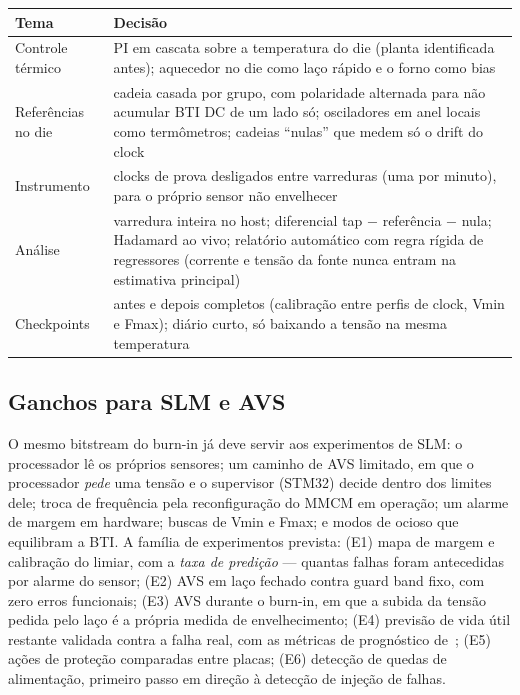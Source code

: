 \documentclass[11pt,a4paper]{article}
\begin{document}
\begin{tabularx}{\textwidth}{@{}l Y@{}}
\toprule
Tema & Decisão \\ \midrule
Controle térmico & PI em cascata sobre a temperatura do die (planta identificada antes); aquecedor no die como laço
rápido e o forno como bias \\
Referências no die & cadeia casada por grupo, com polaridade alternada para não acumular BTI DC de um lado só; osciladores
em anel locais como termômetros; cadeias ``nulas'' que medem só o drift do clock \\
Instrumento & clocks de prova desligados entre varreduras (uma por minuto), para o próprio sensor não envelhecer \\
Análise & varredura inteira no host; diferencial tap $-$ referência $-$ nula; Hadamard ao vivo; relatório automático com
regra rígida de regressores (corrente e tensão da fonte nunca entram na estimativa principal) \\
Checkpoints & antes e depois completos (calibração entre perfis de clock, Vmin e Fmax); diário curto, só baixando a
tensão na mesma temperatura \\
\bottomrule
\end{tabularx}

\subsection{Ganchos para SLM e AVS}

O mesmo bitstream do burn-in já deve servir aos experimentos de SLM: o processador lê os próprios sensores; um caminho de
AVS limitado, em que o processador \emph{pede} uma tensão e o supervisor (STM32) decide dentro dos limites dele; troca de
frequência pela reconfiguração do MMCM em operação; um alarme de margem em hardware; buscas de Vmin e Fmax; e modos de
ocioso que equilibram a BTI. A família de experimentos prevista: (E1) mapa de margem e calibração do limiar, com a
\emph{taxa de predição} --- quantas falhas foram antecedidas por alarme do sensor; (E2) AVS em laço fechado contra guard
band fixo, com zero erros funcionais; (E3) AVS durante o burn-in, em que a subida da tensão pedida pelo laço é a própria
medida de envelhecimento; (E4) previsão de vida útil restante validada contra a falha real, com as métricas de
prognóstico de~\cite{saxena2008metrics}; (E5) ações de proteção comparadas entre placas; (E6) detecção de quedas de
alimentação, primeiro passo em direção à detecção de injeção de falhas.

\end{document}

